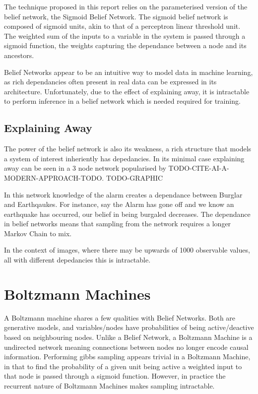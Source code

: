 The technique proposed in this report relies on the parameterised version of the belief network, the Sigmoid Belief Network. The sigmoid belief network is composed of sigmoid units, akin to that of a perceptron linear threshold unit. The weighted sum of the inputs to a variable in the system is passed through a sigmoid function, the weights capturing the dependance between a node and its ancestors.

Belief Networks appear to be an intuitive way to model data in machine learning, as rich dependancies often present in real data can be expressed in its architecture. Unfortunately, due to the effect of explaining away, it is intractable to perform inference in a belief network which is needed required for training.

  \subsection{Explaining Away}

  The power of the belief network is also its weakness, a rich structure that models a system of interest inheriently has depedancies. In its minimal case explaining away can be seen in a 3 node network popularised by TODO-CITE-AI-A-MODERN-APPROACH-TODO. TODO-GRAPHIC

  In this network knowledge of the alarm creates a dependance between Burglar and Earthqaukes. For instance, say the Alarm has gone off and we know an earthquake has occurred, our belief in being burgaled decreases. The dependance in belief networks means that sampling from the network requires a longer Markov Chain to mix.

  In the context of images, where there may be upwards of 1000 observable values, all with different depedancies this is intractable.

\section{Boltzmann Machines}

A Boltzmann machine shares a few qualities with Belief Networks. Both are generative models, and variables/nodes have probabilities of being active/deactive based on neighbouring nodes. Unlike a Belief Network, a Boltzmann Machine is a undirected network meaning connections between nodes no longer encode causal information. Performing gibbs sampling appears trivial in a Boltzmann Machine, in that to find the probability of a given unit being active a weighted input to that node is passed through a sigmoid function. However, in practice the recurrent nature of Boltzmann Machines makes sampling intractable.

